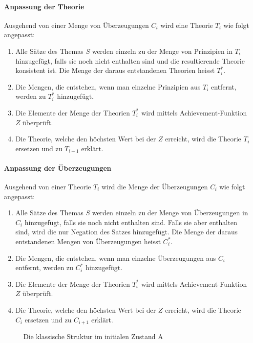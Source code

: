 \documentclass{article}
\begin{document}
\paragraph{Anpassung der Theorie}
Ausgehend von einer Menge von Überzeugungen $C_i$ wird eine Theorie $T_i$ wie folgt angepasst: 
\begin{enumerate}
    \item \label{1} Alle Sätze des Themas $S$ werden einzeln zu der Menge von Prinzipien in $T_i$ hinzugefügt, falls sie noch nicht enthalten sind und die resultierende Theorie konsistent ist. Die Menge der daraus entstandenen Theorien heisst $T_i^*$.
    \item \label{2}Die Mengen, die entstehen, wenn man einzelne Prinzipien aus $T_i$ entfernt, werden zu $T_i^*$ hinzugefügt.
    \item \label{3}Die Elemente der Menge der Theorien $T_i^*$ wird mittels Achievement-Funktion $Z$ überprüft.
    \item \label{4}Die Theorie, welche den höchsten Wert bei der $Z$ erreicht, wird die Theorie $T_i$ ersetzen und zu $T_{i+1}$ erklärt.
\end{enumerate}

\paragraph{Anpassung der Überzeugungen}
Ausgehend von einer Theorie $T_i$ wird die Menge der Überzeugungen $C_i$ wie folgt angepasst:
\begin{enumerate}
    \item \label{c1} Alle Sätze des Themas $S$ werden einzeln zu der Menge von Überzeugungen in $C_i$ hinzugefügt, falls sie noch nicht enthalten sind. Falls sie aber enthalten sind, wird die nur Negation des Satzes hinzugefügt. Die Menge der daraus entstandenen Mengen von Überzeugungen heisst $C_i^*$.
    \item \label{c2} Die Mengen, die entstehen, wenn man einzelne Überzeugungen aus $C_i$ entfernt, werden zu $C_i^*$ hinzugefügt.
    \item \label{c3} Die Elemente der Menge der Theorien $T_i^*$ wird mittels Achievement-Funktion $Z$ überprüft.
    \item \label{c4}Die Theorie, welche den höchsten Wert bei der $Z$ erreicht, wird die Theorie $C_i$ ersetzen und zu $C_{i+1}$ erklärt.
\end{enumerate}

\begin{figure}
  \centering
  
  \caption{Die klassische Struktur im initialen Zustand A\label{fig:classset-initial1}}
\end{figure}
\end{document}

